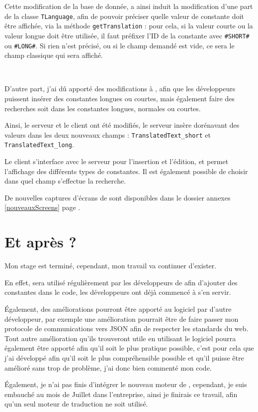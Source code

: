 	Cette modification de la base de donnée, a ainsi induit la modification d'une part de la classe \texttt{TLanguage}, afin de pouvoir préciser quelle valeur de constante doit être affichée, via la méthode \texttt{getTranslation} : pour cela, si la valeur courte ou la valeur longue doit être utilisée, il faut préfixer l'ID de la constante avec \texttt{\#SHORT\#} ou \texttt{\#LONG\#}. Si rien n'est précisé, ou si le champ demandé est vide, ce sera le champ classique qui sera affiché.

	\begin{exemple}
~
\end{exemple}

	D'autre part, j'ai dû apporté des modifications à \mlanguage{}, afin que les développeurs puissent
	insérer des constantes longues ou courtes, mais également faire des recherches soit dans les constantes
	longues, normales ou courtes.

    Ainsi, le serveur et le client ont été modifiés, le serveur insère dorénavant des valeurs dans les deux nouveaux champs : \mbox{\texttt{TranslatedText\_short}} et \texttt{TranslatedText\_long}.

    Le client s'interface avec le serveur pour l'insertion et l'édition, et permet l'affichage des différents types de constantes. Il est également possible de choisir dans quel champ s'effectue la recherche.

    De nouvelles captures d'écrans de \mlanguage{} sont disponibles dans le dossier annexes    \ref{nouveauxScreens} page \pageref{nouveauxScreens}.

\section{Et après ?}
Mon stage est terminé, cependant, mon travail va continuer d'exister.

En effet, \mlanguage{} sera utilisé régulièrement par les développeurs de \adt{} afin d'ajouter des constantes dans le code, les développeurs ont déjà commencé à s'en servir.

\'Egalement, des améliorations pourront être apporté au logiciel par d'autre développeur, par exemple une amélioration pourrait être de faire passer mon protocole de communications vers JSON afin de respecter les standards du web. Tout autre amélioration qu'ils trouveront utile en utilisant le logiciel pourra également être apporté afin qu'il soit le plus pratique possible, c'est pour cela que j'ai développé \mlanguage{} afin qu'il soit le plus compréhensible possible et qu'il puisse être amélioré sans trop de problème, j'ai donc bien commenté mon code.

\'Egalement, je n'ai pas finis d'intégrer le nouveau moteur de \adt{}, cependant, je suis embauché au mois de Juillet dans l'entreprise, ainsi je finirais ce travail, afin qu'un seul moteur de traduction ne soit utilisé.


